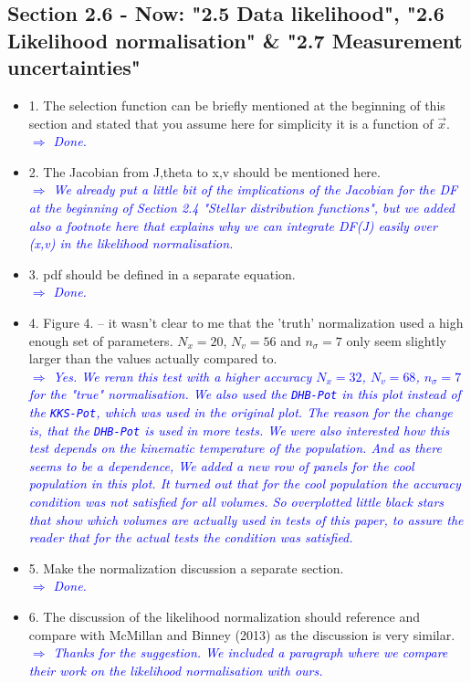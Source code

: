 \documentclass[10pt,a4paper]{article}
\newcommand{\Comment}[1]{\textsl{\textcolor{Blue}{$\Longrightarrow$ {#1}}}}
\begin{document}
\subsection{Section 2.6 - Now: "2.5 Data likelihood", "2.6 Likelihood normalisation" \& "2.7 Measurement uncertainties"}
\begin{itemize}
\item 1. The selection function can be briefly mentioned at the beginning of this section and stated that you assume here for simplicity it is a function of $\vec{x}$. \\\Comment{Done.}
\item 2. The Jacobian from J,theta to x,v should be mentioned here. \\\Comment{We already put a little bit of the implications of the Jacobian for the DF at the beginning of Section 2.4 "Stellar distribution functions", but we added also a footnote here that explains why we can integrate DF(J) easily over (x,v) in the likelihood normalisation.}
\item 3. pdf should be defined in a separate equation. \\\Comment{Done.}
\item 4. Figure 4. -- it wasn't clear to me that the 'truth' normalization used a high enough set of parameters. $N_x=20$, $N_v=56$ and $n_\sigma=7$ only seem slightly larger than the values actually compared to. \\\Comment{Yes. We reran this test with a higher accuracy $N_x=32$, $N_v = 68$, $n_\sigma = 7$ for the "true" normalisation.  We also used the \texttt{DHB-Pot} in this plot instead of the \texttt{KKS-Pot}, which was used in the original plot. The reason for the change is, that the \texttt{DHB-Pot} is used in more tests. We were also interested how this test depends on the kinematic temperature of the population. And as there seems to be a dependence, We added a new row of panels for the cool population in this plot. It turned out that for the cool population the accuracy condition was not satisfied for all volumes. So overplotted little black stars that show which volumes are actually used in tests of this paper, to assure the reader that for the actual tests the condition was satisfied.}
\item 5. Make the normalization discussion a separate section. \\\Comment{Done.}
\item 6. The discussion of the likelihood normalization should reference and compare with McMillan and Binney (2013) as the discussion is very similar. \\\Comment{Thanks for the suggestion. We included a paragraph where we compare their work on the likelihood normalisation with ours.}

\end{itemize}
\end{document}
